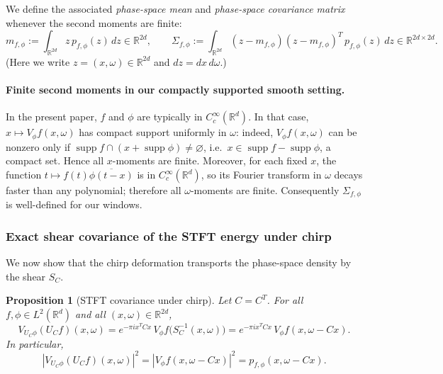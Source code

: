 \documentclass[final,1p,times,authoryear]{elsarticle}
\newtheorem{proposition}[theorem]{Proposition}
\theoremstyle{definition}
\newcommand{\R}{\mathbb{R}}
\newcommand{\1}{\mathbf{1}}
\begin{document}
We define the associated \emph{phase-space mean} and \emph{phase-space covariance matrix}
whenever the second moments are finite:
$$
m_{f,\phi}:=\int_{\R^{2d}} z\,p_{f,\phi}(z)\,dz \in \R^{2d},
\qquad
\Sigma_{f,\phi}:=\int_{\R^{2d}} (z-m_{f,\phi})(z-m_{f,\phi})^T\,p_{f,\phi}(z)\,dz \in \R^{2d\times 2d}.
$$
(Here we write $z=(x,\omega)\in\R^{2d}$ and $dz=dx\,d\omega$.)

\paragraph{Finite second moments in our compactly supported smooth setting.}
In the present paper, $f$ and $\phi$ are typically in $C_c^\infty(\R^d)$.
In that case, $x\mapsto V_\phi f(x,\omega)$ has compact support uniformly in $\omega$:
indeed, $V_\phi f(x,\omega)$ can be nonzero only if $\operatorname{supp} f\cap(x+\operatorname{supp}\phi)\neq\varnothing$,
i.e.\ $x\in \operatorname{supp} f-\operatorname{supp}\phi$, a compact set. Hence all $x$-moments are finite.
Moreover, for each fixed $x$, the function $t\mapsto f(t)\overline{\phi(t-x)}$ is in $C_c^\infty(\R^d)$,
so its Fourier transform in $\omega$ decays faster than any polynomial; therefore all $\omega$-moments are finite.
Consequently $\Sigma_{f,\phi}$ is well-defined for our windows.

\subsubsection{Exact shear covariance of the STFT energy under chirp}
We now show that the chirp deformation transports the phase-space density by the shear $S_C$.

\begin{proposition}[STFT covariance under chirp]\label{prop:stft_chirp_cov}
Let $C=C^T$. For all $f,\phi\in L^2(\R^d)$ and all $(x,\omega)\in\R^{2d}$,
\begin{equation}\label{eq:stft_covariance}
V_{U_C\phi}(U_C f)(x,\omega)
=
e^{-\pi i x^T C x}\,V_\phi f\!\big(S^{-1}_C(x,\omega)\big)
=
e^{-\pi i x^T C x}\,V_\phi f(x,\omega-Cx).
\end{equation}
In particular,
\begin{equation}\label{eq:energy_covariance}
|V_{U_C\phi}(U_C f)(x,\omega)|^2
=
|V_\phi f(x,\omega-Cx)|^2
=
p_{f,\phi}(x,\omega-Cx).
\end{equation}
\end{proposition}
\end{document}
